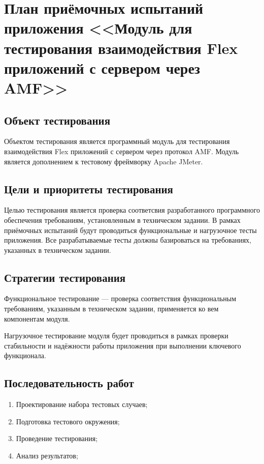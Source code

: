 \chapter{План приёмочных испытаний приложения <<Модуль для тестирования взаимодействия Flex приложений с сервером через AMF>>}
\label{cha:appendix2}

\section{Объект тестирования}

Объектом тестирования является программный модуль для тестирования взаимодействия Flex приложений с сервером через
протокол AMF. Модуль является дополнением к тестовому фреймворку Apache JMeter.

\section{Цели и приоритеты тестирования}

Целью тестирования является проверка соответсвия разработанного программного обеспечения требованиям, установленным
в техническом задании. В рамках приёмочных испытаний будут проводиться функциональные и нагрузочное тесты приложения.
Все разрабатываемые тесты должны базироваться на требованиях, указанных в техническом задании.

\section{Стратегии тестирования}

Функциональное тестирование --- проверка соответствия функциональным требованиям, указанным в техническом задании,
применяется ко вем компонентам модуля.

Нагрузочное тестирование модуля будет проводиться в рамках проверки стабильности и надёжности работы приложения при
выполнении ключевого функционала.

\section{Последовательность работ}

\begin{enumerate}
\item Проектирование набора тестовых случаев;
\item Подготовка тестового окружения;
\item Проведение тестирования;
\item Анализ результатов;
\end{enumerate}

